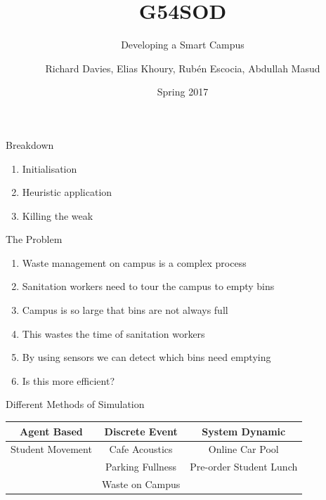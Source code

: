 \documentclass[24pt]{beamer}
\title{G54SOD}
\subtitle{Developing a Smart Campus}
\date{Spring 2017}
\author{Richard Davies, Elias Khoury, Rub\'{e}n Escocia, Abdullah Masud}
\institute{The University of Nottingham}
\begin{document}
    \graphicspath{ {images/} }
    \maketitle

    \begin{frame}{Breakdown}
        \begin{enumerate}
            \item Initialisation
            \item Heuristic application
            \item Killing the weak
        \end{enumerate}
    \end{frame}


    \begin{frame}{The Problem}
        \begin{enumerate}
            \item Waste management on campus is a complex process \pause
            \item Sanitation workers need to tour the campus to empty bins \pause
            \item Campus is so large that bins are not always full \pause
            \item This wastes the time of sanitation workers \pause
            \item By using sensors we can detect which bins need emptying \pause
            \item Is this more efficient?
        \end{enumerate}
    \end{frame}

    \begin{frame}{Different Methods of Simulation}
        \begin{centering} 
            \begin{tabular}{| c | c | c |}
                \hline
                Agent Based      & Discrete Event  & System Dynamic \\
                \hline
                \pause
                Student Movement & Cafe Acoustics    & Online Car Pool \\ \pause
                                 & Parking Fullness  & Pre-order Student Lunch \\ \pause
                                 & Waste on Campus   & \\

                \hline

            \end{tabular}
        \end{centering}
    \end{frame}
\end{document}
